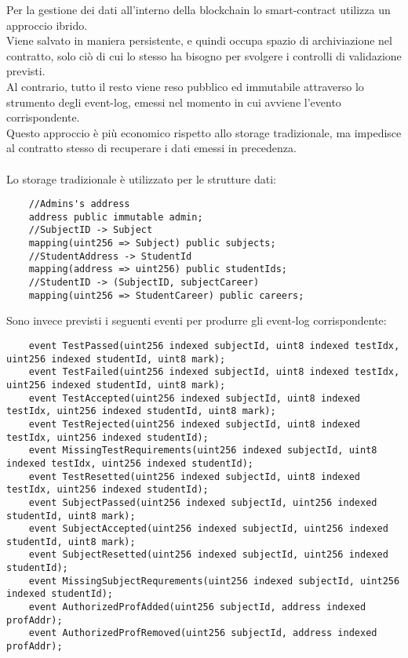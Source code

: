 Per la gestione dei dati all'interno della blockchain lo \gls{smart-contract} utilizza un approccio ibrido. \\
Viene salvato in maniera persistente, e quindi occupa spazio di archiviazione nel contratto, solo ciò di cui lo stesso ha bisogno per
svolgere i controlli di validazione previsti. \\
Al contrario, tutto il resto viene reso pubblico ed immutabile attraverso lo strumento degli \gls{event-log},
emessi nel momento in cui avviene l'evento corrispondente. \\
Questo approccio è più economico rispetto allo storage tradizionale, ma impedisce al contratto stesso di recuperare i dati emessi in precedenza. \\
\\
Lo storage tradizionale è utilizzato per le strutture dati:
\begin{verbatim}
    //Admins's address
    address public immutable admin;
    //SubjectID -> Subject
    mapping(uint256 => Subject) public subjects;
    //StudentAddress -> StudentId
    mapping(address => uint256) public studentIds;
    //StudentID -> (SubjectID, subjectCareer)
    mapping(uint256 => StudentCareer) public careers;
\end{verbatim}

Sono invece previsti i seguenti eventi per produrre gli \gls{event-log} corrispondente:

\begin{verbatim}
    event TestPassed(uint256 indexed subjectId, uint8 indexed testIdx, uint256 indexed studentId, uint8 mark);
    event TestFailed(uint256 indexed subjectId, uint8 indexed testIdx, uint256 indexed studentId, uint8 mark);
    event TestAccepted(uint256 indexed subjectId, uint8 indexed testIdx, uint256 indexed studentId, uint8 mark);
    event TestRejected(uint256 indexed subjectId, uint8 indexed testIdx, uint256 indexed studentId);
    event MissingTestRequirements(uint256 indexed subjectId, uint8 indexed testIdx, uint256 indexed studentId);
    event TestResetted(uint256 indexed subjectId, uint8 indexed testIdx, uint256 indexed studentId);
    event SubjectPassed(uint256 indexed subjectId, uint256 indexed studentId, uint8 mark);
    event SubjectAccepted(uint256 indexed subjectId, uint256 indexed studentId, uint8 mark);
    event SubjectResetted(uint256 indexed subjectId, uint256 indexed studentId);
    event MissingSubjectRequrements(uint256 indexed subjectId, uint256 indexed studentId);
    event AuthorizedProfAdded(uint256 subjectId, address indexed profAddr);
    event AuthorizedProfRemoved(uint256 subjectId, address indexed profAddr);
\end{verbatim}